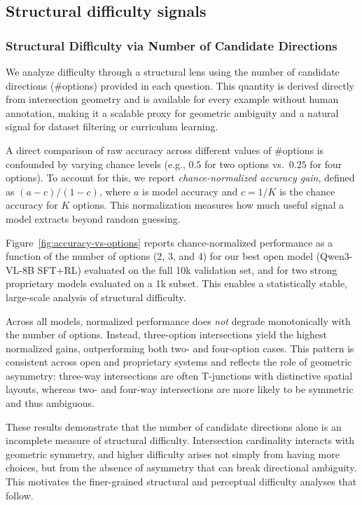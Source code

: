 \documentclass{article}
\begin{document}
\subsection{Structural difficulty signals}
\label{sec:analysis-difficulty-structural-signals}


\subsubsection{Structural Difficulty via Number of Candidate Directions}
\label{sec:analysis-options}

We analyze difficulty through a structural lens using the number of candidate
directions (\#options) provided in each question. This quantity is derived
directly from intersection geometry and is available for every example without
human annotation, making it a scalable proxy for geometric ambiguity and a
natural signal for dataset filtering or curriculum learning.

A direct comparison of raw accuracy across different values of \#options is
confounded by varying chance levels (e.g., $0.5$ for two options vs.\ $0.25$ for
four options). To account for this, we report \emph{chance-normalized accuracy
gain}, defined as $(a - c)/(1 - c)$, where $a$ is model accuracy and
$c = 1/K$ is the chance accuracy for $K$ options. This normalization measures how
much useful signal a model extracts beyond random guessing.

Figure~\ref{fig:accuracy-vs-options} reports chance-normalized performance as a
function of the number of options (2, 3, and 4) for our best open model
(Qwen3-VL-8B SFT+RL) evaluated on the full 10k validation set, and for two strong
proprietary models evaluated on a 1k subset. This enables a statistically stable,
large-scale analysis of structural difficulty.

Across all models, normalized performance does \emph{not} degrade monotonically
with the number of options. Instead, three-option intersections yield the highest
normalized gains, outperforming both two- and four-option cases. This pattern is
consistent across open and proprietary systems and reflects the role of
geometric asymmetry: three-way intersections are often T-junctions with
distinctive spatial layouts, whereas two- and four-way intersections are more
likely to be symmetric and thus ambiguous.

These results demonstrate that the number of candidate directions alone is an
incomplete measure of structural difficulty. Intersection cardinality interacts
with geometric symmetry, and higher difficulty arises not simply from having
more choices, but from the absence of asymmetry that can break directional
ambiguity. This motivates the finer-grained structural and perceptual difficulty
analyses that follow.
\end{document}
